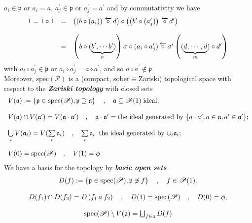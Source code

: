 \documentclass[leqno]{article}
\newcommand{\pid}{\mathfrak{p}}
\newcommand{\oneideal}{\mathfrak{a}}
\newcommand{\myemph}[1]{{\it{\bf{#1}}}}
\newcommand{\biop}{\mathscr{P}}
\newcommand{\circleftarrow}{\,\overleftarrow{\circ}\,}
\numberwithin{equation}{section}
\begin{document}
$a_{i}\in \pid$ or $a_{i}=a$, $a_{j}^{\prime}\in \pid$ or 
$a_{j}^{\prime}=a^{\prime}$ and by commutativity we have
\begin{equation*}
				\begin{array}[H]{lll}
								1 = 1\circ 1 &=& \left(\left(b\circ (a_{i}) \right)\circleftarrow
								d\right)\circ \left(\left(
												b^{\prime}\circ (a_{j}^{\prime})
				\right)\circleftarrow d^{\prime}\right) \\\\
								&=& \left( b\circ (\underbrace{b^{\prime},\cdots b^{\prime}}_{n})
								\right)\sigma \circ
								(a_{i}\circ a_{j}^{\prime})\circleftarrow \sigma^{\prime}\left(
												(\underbrace{d,\cdots , d}_{m})\circ d^{\prime}
								\right)
				\end{array}
\end{equation*}
with $a_{i}\circ a_{j}^{\prime}\in \pid$ or $a_{i}\circ a_{j}^{\prime}= a\circ a^{\prime}$,
and so $a\circ a^{\prime}\not\in \pid$. \\
Moreover, $\text{spec}(\biop)$ is a (compact,
sober$\equiv$Zariski) topological space with respect to the \myemph{Zariski topology} with
closed sets
\begin{equation}
				\begin{array}[H]{l}
				V(\oneideal):= \left\{ \pid\in \text{spec}(\biop),\pid\supseteq \oneideal \right\} \quad ,
				\quad \oneideal\subseteq \biop(1)\; \text{ideal}, \\\\
				V(\oneideal)\cap V(\oneideal^{\prime})=V(\oneideal\cdot \oneideal^{\prime})\quad ,
				\quad \oneideal\cdot\oneideal^{\prime}=\text{the ideal generated by $\left\{
												a\cdot a^{\prime},a\in \oneideal, a^{\prime}\in
												\oneideal^{\prime}
				\right\}$}; \\\\
				\bigcup\limits_{i}V(\oneideal_{i})=V(\sum\limits_{i}\oneideal_{i}) \quad , \quad
				\sum\limits_{i}\oneideal_{i}\;\;\text{the ideal generated by
				$\cup_{i} \oneideal_{i}$}; \\\\
				V(0)=\text{spec}(\biop)\quad , \quad V(1)=\phi
				\end{array}
				\label{eq:5.4}
\end{equation}
We have a basis for the topology by \myemph{basic open sets}
\begin{equation}
				\begin{array}[H]{c}
				D(f):=\left\{ \pid\in \text{spec}(\biop), \pid\not\ni f \right\}\quad , \quad
				f\in\biop(1). \\\\
				D(f_1)\cap D(f_2)=D\left(f_1\circ f_2\right) \quad , \quad D(1)=\text{spec}(\biop)\quad ,
				\quad D(0)=\phi, \\\\
				\text{spec}(\biop)\setminus V(\oneideal)=\bigcup_{f\in \mathfrak{a}}D(f)
				\end{array}
				\label{eq:5.5}
\end{equation}
\end{document}
